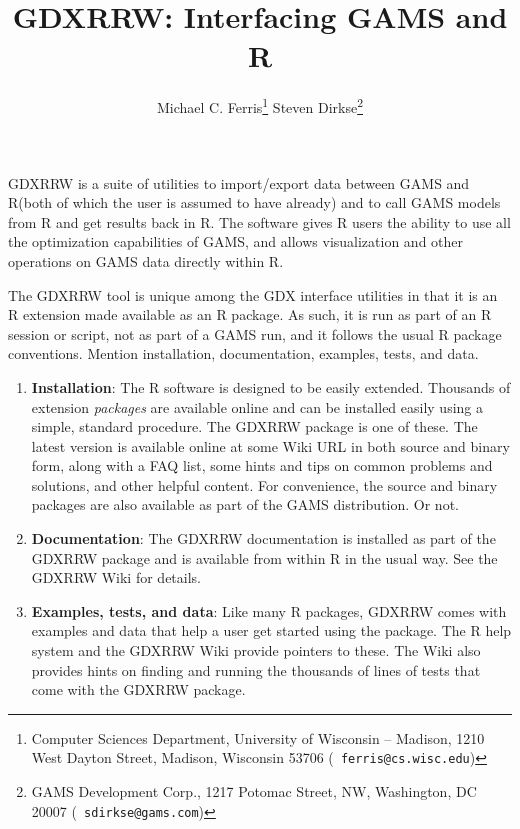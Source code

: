 \documentclass{article}
\newcommand{\gdxrrw}{GDXRRW\xspace}
\newcommand{\R}{R\xspace}
\newcommand{\gams}{GAMS\xspace}
\newcommand{\gdx}{GDX\xspace}
\begin{document}
\title{\gdxrrw: Interfacing \gams and \R}
  \author{Michael C. Ferris\thanks{ Computer
    Sciences Department, University of Wisconsin -- Madison, 1210 West
    Dayton Street, Madison, Wisconsin 53706 ({\tt
    ferris@cs.wisc.edu})}
    \space \space Steven Dirkse\thanks { GAMS Development Corp.,
    1217 Potomac Street, NW,  Washington, DC  20007 ({\tt
    sdirkse@gams.com})}  }
\maketitle

\gdxrrw is a suite of utilities to import/export data between \gams
and \R (both of which the user is assumed to have already) and to
call \gams models from \R and get results back in \R. The software
gives \R users the ability to use all the optimization capabilities of
\gams, and allows visualization and other operations on \gams data
directly within \R.

The \gdxrrw tool is unique among the \gdx interface utilities in that
it is an \R extension made available as an \R package.  As such, it is
run as part of an R session or script, not as part of a GAMS run, and it
follows the usual \R package conventions.  Mention installation,
documentation, examples, tests, and data.
\begin{enumerate}
  \item {\bf Installation}: The \R software is designed to be easily
    extended.  Thousands of extension \emph{packages} are available
    online and can be installed easily using a simple, standard
    procedure.  The \gdxrrw package is one of these.  The latest
    version is available online at some Wiki URL in both source and binary
    form, along with a FAQ list,
    some hints and tips on common problems and solutions, and other
    helpful content.  For convenience, the source and binary packages
    are also available as part of the GAMS distribution.  Or not.
  \item {\bf Documentation}: The \gdxrrw documentation is installed as
    part of the \gdxrrw package and is available from within \R in the
    usual way.  See the \gdxrrw Wiki for details.
  \item {\bf Examples, tests, and data}: Like many \R packages,
    \gdxrrw comes with examples and data that help a user get started
    using the package.  The \R help system and the \gdxrrw Wiki
    provide pointers to these.  The Wiki also provides hints on
    finding and running the thousands of lines of tests that come with
    the \gdxrrw package.
\end{enumerate}
\end{document}
